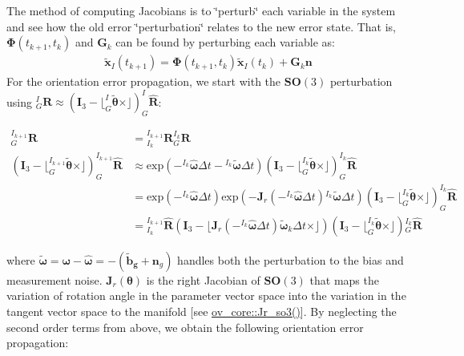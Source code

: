 The method of computing Jacobians is to \char`\"{}perturb\char`\"{} each variable in the system and see how the old error \char`\"{}perturbation\char`\"{} relates to the new error state. That is, $\boldsymbol{\Phi}(t_{k+1},t_k)$ and $\mathbf{G}_{k}$ can be found by perturbing each variable as\+: \begin{align*} \tilde{\mathbf{x}}_I(t_{k+1}) = \boldsymbol{\Phi}(t_{k+1},t_k) \tilde{\mathbf{x}}_I(t_{k}) + \mathbf{G}_{k} \mathbf{n} \end{align*} For the orientation error propagation, we start with the $\mathbf{SO}(3)$ perturbation using ${}^{I}_G \mathbf{R} \approx (\mathbf{I}_3 - \lfloor ^{I}_{G}\tilde{\boldsymbol{\theta}}\times\rfloor)^{I}_{G} \hat{\mathbf{R}}$\+:

\begin{align*} {}^{I_{k+1}}_G \mathbf{R} &= \text{}^{I_{k+1}}_{I_{k}} \mathbf{R} \text{}^{I_{k}}_G \mathbf{R} \\ (\mathbf{I}_3 - \lfloor ^{I_{k+1}}_{G}\tilde{\boldsymbol{\theta}}\times\rfloor)^{I_{k+1}}_{G} \hat{\mathbf{R}} &\approx \textrm{exp}(-{}^{I_{k}}\hat{\boldsymbol{\omega}}\Delta t - {}^{I_{k}}\tilde{\boldsymbol{\omega}}\Delta t) (\mathbf{I}_3 - \lfloor ^{I_{k}}_{G}\tilde{\boldsymbol{\theta}}\times\rfloor)^{I_{k}}_{G} \hat{\mathbf{R}}\\ &=\textrm{exp}(-{}^{I_{k}}\hat{\boldsymbol{\omega}}\Delta t)\textrm{exp}(-\mathbf{J}_r(-{}^{I_{k}}\hat{\boldsymbol{\omega}}\Delta t){}^{I_{k}}\tilde{\boldsymbol{\omega}}\Delta t) (\mathbf{I}_3 - \lfloor ^{I_{k}}_{G}\tilde{\boldsymbol{\theta}}\times\rfloor)^{I_{k}}_{G} \hat{\mathbf{R}}\\ &=\text{}^{I_{k+1}}_{I_{k}} \hat{\mathbf{R}} (\mathbf{I}_3 - \lfloor \mathbf J_r(-{}^{I_{k}}\hat{\boldsymbol{\omega}}\Delta t) \tilde{\boldsymbol{\omega}}_k\Delta t \times\rfloor) (\mathbf{I}_3 - \lfloor ^{I_k}_{G}\tilde{\boldsymbol{\theta}}\times\rfloor) \text{}^{I_{k}}_G \hat{\mathbf{R}} \end{align*}

where $\tilde{\boldsymbol{\omega}} = \boldsymbol{\omega} - \hat{\boldsymbol{\omega}} = -(\tilde{\mathbf{b}}_{\mathbf{g}} + \mathbf{n}_g)$ handles both the perturbation to the bias and measurement noise. $\mathbf {J}_r(\boldsymbol{\theta})$ is the right Jacobian of $\mathbf{SO}(3)$ that maps the variation of rotation angle in the parameter vector space into the variation in the tangent vector space to the manifold \mbox{[}see \hyperlink{namespaceov__core_a0406d085d6175d3bc8a539328ec214b5}{ov\+\_\+core\+::\+Jr\+\_\+so3()}\mbox{]}. By neglecting the second order terms from above, we obtain the following orientation error propagation\+:

